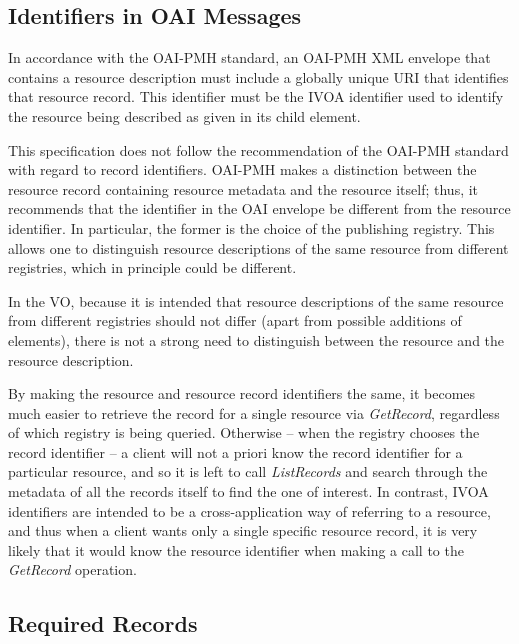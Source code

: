 \documentclass{ivoa}
\newcommand{\oaiop}[1]{\textit{#1}}
\begin{document}
\subsection{Identifiers in OAI Messages}

\label{oaiidentifiers}

In accordance with the OAI-PMH standard, an OAI-PMH XML envelope that
contains a resource description must include a globally unique URI that
identifies that resource record. This identifier must be the IVOA
identifier used to identify the resource being described as given in
its  child element.

This specification does not follow the recommendation of the OAI-PMH
standard with regard to record identifiers. OAI-PMH makes a distinction
between the resource record containing resource metadata and the
resource itself; thus, it recommends that the identifier in the OAI
envelope be different from the resource identifier. In particular, the
former is the choice of the publishing registry. This allows one to
distinguish resource descriptions of the same resource from different
registries, which in principle could be different.

In the VO, because it is intended that resource descriptions of the
same resource from different registries should not differ (apart from
possible additions of  elements), there
is not a strong need to distinguish between the resource and the
resource description. 

By making the resource and resource record
identifiers the same, it becomes much easier to retrieve the record for
a single resource via \oaiop{GetRecord}, regardless of which
registry is being queried.  Otherwise -- when the registry chooses
the record identifier -- a client will not a priori know the record
identifier for a particular resource, and so it is left to call
\oaiop{ListRecords}  and search through the metadata of all the
records itself to find the one of interest. In contrast, IVOA
identifiers are intended to be a cross-application way of referring to a
resource, and thus when a client wants only a single specific resource
record, it is very likely that it would know the resource identifier
when making a call to the \oaiop{GetRecord} operation.


\subsection{Required Records}
\label{oairequired}
\end{document}

